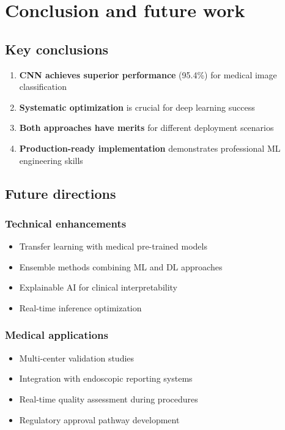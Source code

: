 \documentclass[11pt]{article}
\begin{document}
\section{Conclusion and future work}

\subsection{Key conclusions}
\begin{enumerate}
    \item \textbf{CNN achieves superior performance} (95.4\%) for medical image classification
    \item \textbf{Systematic optimization} is crucial for deep learning success
    \item \textbf{Both approaches have merits} for different deployment scenarios
    \item \textbf{Production-ready implementation} demonstrates professional ML engineering skills
\end{enumerate}

\subsection{Future directions}

\subsubsection{Technical enhancements}
\begin{itemize}
    \item Transfer learning with medical pre-trained models
    \item Ensemble methods combining ML and DL approaches
    \item Explainable AI for clinical interpretability
    \item Real-time inference optimization
\end{itemize}

\subsubsection{Medical applications}
\begin{itemize}
    \item Multi-center validation studies
    \item Integration with endoscopic reporting systems
    \item Real-time quality assessment during procedures
    \item Regulatory approval pathway development
\end{itemize}
\end{document}
